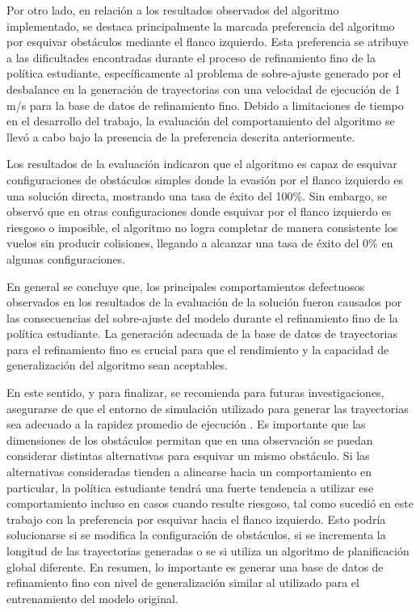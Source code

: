 Por otro lado, en relación a los resultados observados del algoritmo implementado, se destaca principalmente la marcada preferencia del algoritmo por esquivar obstáculos mediante el flanco izquierdo. Esta preferencia se atribuye a las dificultades encontradas durante el proceso de refinamiento fino de la política estudiante, específicamente al problema de sobre-ajuste generado por el desbalance en la generación de trayectorias con una velocidad de ejecución de 1 m/s para la base de datos de refinamiento fino. Debido a limitaciones de tiempo en el desarrollo del trabajo, la evaluación del comportamiento del algoritmo se llevó a cabo bajo la presencia de la preferencia descrita anteriormente.

Los resultados de la evaluación indicaron que el algoritmo es capaz de esquivar configuraciones de obstáculos simples donde la evasión por el flanco izquierdo es una solución directa, mostrando una tasa de éxito del 100\%. Sin embargo, se observó que en otras configuraciones donde esquivar por el flanco izquierdo es riesgoso o imposible, el algoritmo no logra completar de manera consistente los vuelos sin producir colisiones, llegando a alcanzar una tasa de éxito del 0\% en algunas configuraciones.

En general se concluye que, los principales comportamientos defectuosos observados en los resultados de la evaluación de la solución fueron causados por las consecuencias del sobre-ajuste del modelo durante el refinamiento fino de la política estudiante. La generación adecuada de la base de datos de trayectorias para el refinamiento fino es crucial para que el rendimiento y la capacidad de generalización del algoritmo sean aceptables. 

En este sentido, y para finalizar, se recomienda para futuras investigaciones, asegurarse de que el entorno de simulación utilizado para generar las trayectorias sea adecuado a la rapidez promedio de ejecución . Es importante que las dimensiones de los obstáculos permitan que en una observación se puedan considerar distintas alternativas para esquivar un mismo obstáculo. Si las alternativas consideradas tienden a alinearse hacia un comportamiento en particular, la política estudiante tendrá una fuerte tendencia a utilizar ese comportamiento incluso en casos cuando resulte riesgoso, tal como sucedió en este trabajo con la preferencia por esquivar hacia el flanco izquierdo. Esto podría solucionarse si se modifica la configuración de obstáculos, si se incrementa la longitud de las trayectorias generadas o se si utiliza un algoritmo de planificación global diferente. En resumen, lo importante es generar una base de datos de refinamiento fino con nivel de generalización similar al utilizado para el entrenamiento del modelo original.